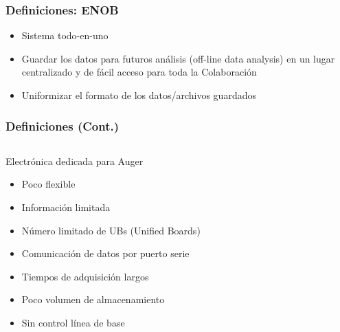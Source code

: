 \documentclass{beamer}
\begin{document}
\begin{frame}
	\frametitle{Definiciones: ENOB}
		\begin{block}{}
    	\begin{itemize}
      	\item Sistema todo-en-uno
        \item Guardar los datos para futuros análisis (off-line data analysis)
              en un lugar centralizado y de fácil acceso para toda la
							Colaboración
        \item Uniformizar el formato de los datos/archivos guardados
    	\end{itemize}
		\end{block}
\end{frame} 

\begin{frame}
	\frametitle{Definiciones (Cont.)}
		\begin{columns}
			\begin{column}{0.50\textwidth}
				\begin{block}{Electrónica dedicada para Auger}
		    	\begin{itemize}
		      	\item Poco flexible 
		      	\item Información limitada
		      	\item Número limitado de UBs (\alert{Unified Boards})
						\item Comunicación de datos por puerto serie
						\item	Tiempos de adquisición largos
						\item	Poco volumen de almacenamiento
						\item Sin control línea de base	
		    	\end{itemize}
				\end{block}
			\end{column} 
		 	\begin{column}{0.50\textwidth}
		 \end{column}
		\end{columns}
\end{frame} 
\end{document}
